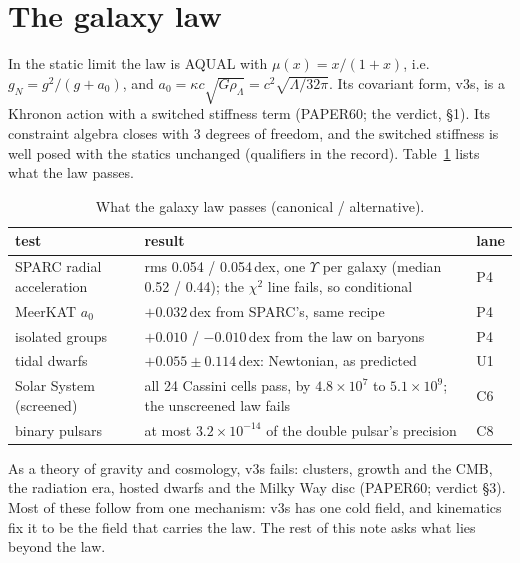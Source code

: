 \documentclass[10pt]{article}
\begin{document}
\section{The galaxy law}
In the static limit the law is AQUAL with $\mu(x)=x/(1+x)$, i.e.\ $g_N=g^2/(g+a_0)$, and $a_0=\kappa c\sqrt{G\rho_\Lambda}=c^2\sqrt{\Lambda/32\pi}$. Its covariant form, v3s, is a Khronon action with a switched stiffness term (PAPER60; the verdict, \S1). Its constraint algebra closes with 3 degrees of freedom, and the switched stiffness is well posed with the statics unchanged (qualifiers in the record). Table~\ref{tab:pass} lists what the law passes.

\begin{table}[h]\centering\small
\caption{What the galaxy law passes (canonical / alternative).}\label{tab:pass}
\begin{tabular}{p{}p{}l}
\toprule
test & result & lane\\
\midrule
SPARC radial acceleration & rms 0.054 / 0.054\,dex, one $\Upsilon$ per galaxy (median 0.52 / 0.44); the $\chi^2$ line fails, so conditional & P4\\
MeerKAT $a_0$ & $+0.032$\,dex from SPARC's, same recipe & P4\\
isolated groups & $+0.010$ / $-0.010$\,dex from the law on baryons & P4\\
tidal dwarfs & $+0.055\pm0.114$\,dex: Newtonian, as predicted & U1\\
Solar System (screened) & all 24 Cassini cells pass, by $4.8\times10^{7}$ to $5.1\times10^{9}$; the unscreened law fails & C6\\
binary pulsars & at most $3.2\times10^{-14}$ of the double pulsar's precision & C8\\
\bottomrule
\end{tabular}
\end{table}

As a theory of gravity and cosmology, v3s fails: clusters, growth and the CMB, the radiation era, hosted dwarfs and the Milky Way disc (PAPER60; verdict \S3). Most of these follow from one mechanism: v3s has one cold field, and kinematics fix it to be the field that carries the law. The rest of this note asks what lies beyond the law.
\end{document}
